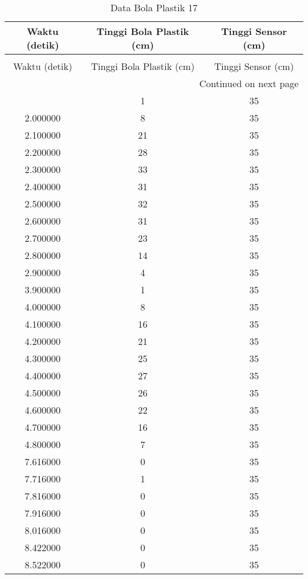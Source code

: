 \begin{longtable}[htbp]{|c|c|c|}
\caption{Data Bola Plastik 17} \\
\hline
Waktu (detik) & Tinggi Bola Plastik (cm) & Tinggi Sensor (cm) \\ \hline
\endfirsthead
\caption[]{Data Bola Plastik 17} \\
\hline
Waktu (detik) & Tinggi Bola Plastik (cm) & Tinggi Sensor (cm) \\ \hline
\endhead
\multicolumn{3}{r}{Continued on next page} \\
\endfoot
\endlastfoot
1.900000 & 1 & 35 \\ \hline
2.000000 & 8 & 35 \\ \hline
2.100000 & 21 & 35 \\ \hline
2.200000 & 28 & 35 \\ \hline
2.300000 & 33 & 35 \\ \hline
2.400000 & 31 & 35 \\ \hline
2.500000 & 32 & 35 \\ \hline
2.600000 & 31 & 35 \\ \hline
2.700000 & 23 & 35 \\ \hline
2.800000 & 14 & 35 \\ \hline
2.900000 & 4 & 35 \\ \hline
3.900000 & 1 & 35 \\ \hline
4.000000 & 8 & 35 \\ \hline
4.100000 & 16 & 35 \\ \hline
4.200000 & 21 & 35 \\ \hline
4.300000 & 25 & 35 \\ \hline
4.400000 & 27 & 35 \\ \hline
4.500000 & 26 & 35 \\ \hline
4.600000 & 22 & 35 \\ \hline
4.700000 & 16 & 35 \\ \hline
4.800000 & 7 & 35 \\ \hline
7.616000 & 0 & 35 \\ \hline
7.716000 & 1 & 35 \\ \hline
7.816000 & 0 & 35 \\ \hline
7.916000 & 0 & 35 \\ \hline
8.016000 & 0 & 35 \\ \hline
8.422000 & 0 & 35 \\ \hline
8.522000 & 0 & 35 \\ \hline
\end{longtable}
